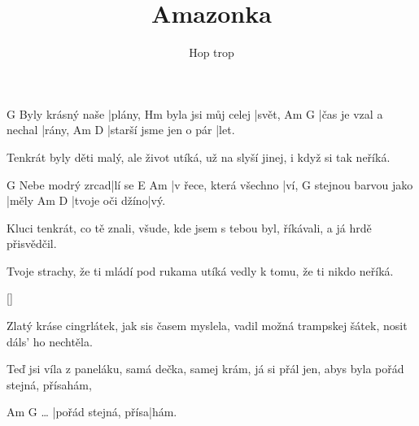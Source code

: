 \documentclass{song}
\title{Amazonka}
\author{Hop trop}
\begin{document}
\strophe
                 G
Byly krásný naše |plány,
                   Hm
byla jsi můj celej |svět,
Am                    G
|čas je vzal a nechal |rány,
Am                     D
|starší jsme jen o pár |let.
\endstrophe

\strophe*
Tenkrát byly děti malý,
ale život utíká,
už na  slyší jinej,
i když si tak neříká.
\endstrophe

                G
Nebe modrý zrcad|lí se
E\7                    Am
|v řece, která všechno |ví,
                    G
stejnou barvou jako |měly
Am              D
|tvoje oči džíno|vý.
\endstrophe

\strophe*
Kluci tenkrát, co tě znali,
všude, kde jsem s tebou byl,
 říkávali,
a já hrdě přisvědčil.
\endstrophe

\strophe*
Tvoje strachy, že ti mládí
pod rukama utíká
vedly k tomu, že ti nikdo
 neříká.
\endstrophe

\ref{}

\strophe*
Zlatý kráse cingrlátek,
jak sis časem myslela,
vadil možná trampskej šátek,
nosit dáls' ho nechtěla.
\endstrophe

Teď jsi víla z paneláku,
samá dečka, samej krám,
já si přál jen, abys byla
pořád stejná, přísahám,
\endstrophe

\strophe
         Am                  G
\ldots{} |pořád stejná, přísa|hám.
\endstrophe
\end{document}
